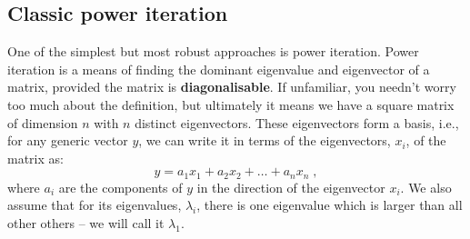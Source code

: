 \documentclass{article}
\begin{document}
\subsection{Classic power iteration}
One of the simplest but most robust approaches is power iteration. Power iteration is a means of finding the dominant eigenvalue and eigenvector of a matrix, provided the matrix is \textbf{diagonalisable}. If unfamiliar, you needn't worry too much about the definition, but ultimately it means we have a square matrix of dimension $n$ with $n$ distinct eigenvectors. These eigenvectors form a basis, i.e., for any generic vector $y$, we can write it in terms of the eigenvectors, $x_i$, of the matrix as:
\begin{equation}
    y = a_1 x_1 + a_2 x_2 +\ldots + a_n x_n\;\mathrm{,}
\end{equation}
where $a_i$ are the components of $y$ in the direction of the eigenvector $x_i$. We also assume that for its eigenvalues, $\lambda_i$, there is one eigenvalue which is larger than all other others -- we will call it $\lambda_1$.
\end{document}
